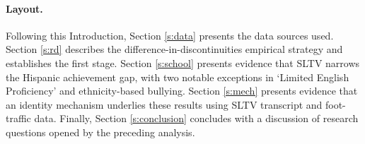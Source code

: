 \documentclass[11pt]{article}
\begin{document}








\paragraph{Layout.} Following this Introduction, Section \ref{s:data} presents the data sources used. Section \ref{s:rd} describes the difference-in-discontinuities empirical strategy and establishes the first stage. Section \ref{s:school} presents evidence that SLTV narrows the Hispanic achievement gap, with two notable exceptions in `Limited English Proficiency' and ethnicity-based bullying. Section \ref{s:mech} presents evidence that an identity mechanism underlies these results using SLTV transcript and foot-traffic data. Finally, Section \ref{s:conclusion} concludes with a discussion of research questions opened by the preceding analysis.
\end{document}
